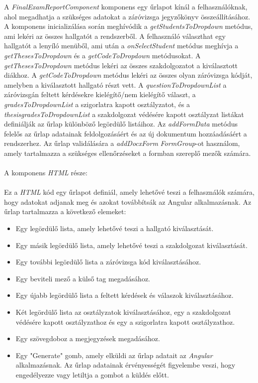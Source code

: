A \textit{FinalExamReportComponent} komponens egy űrlapot kínál a felhasználóknak, ahol megadhatja a szükséges adatokat a záróvizsga jegyzőkönyv összeállításához. A komponens inicializálása során meghívódik a \textit{getStudentsToDropdown} metódus, ami lekéri az összes hallgatót a rendszerből. A felhasználó választhat egy hallgatót a lenyíló menüből, ami után a \textit{onSelectStudent} metódus meghívja a \textit{getThesesToDropdown} és a \textit{getCodeToDropdown} metódusokat. A \textit{getThesesToDropdown} metódus lekéri az összes szakdolgozatot a kiválasztott diákhoz. A \textit{getCodeToDropdown} metódus lekéri az összes olyan záróvizsga kódját, amelyben a kiválasztott hallgató részt vett. A \textit{questionToDropdownList} a záróvizsgán feltett kérdésekre kielégítő/nem kielégítő választ, a \textit{gradesToDropdownList} a szigorlatra kapott osztályzatot, és a \textit{thesisgradesToDropdownList} a szakdolgozat védésére kapott osztályzat listákat definiálják az űrlap különböző legördülő listáihoz. Az \textit{addFormData} metódus felelős az űrlap adatainak feldolgozásáért és az új dokumentum hozzáadásáért a rendszerhez. Az űrlap validálására a \textit{addDocxForm} \textit{FormGroup}-ot használom, amely tartalmazza a szükséges ellenőrzéseket a formban szereplő mezők számára.\\
\\A komponens \textit{HTML} része:\\
\\
Ez a \textit{HTML} kód egy űrlapot definiál, amely lehetővé teszi a felhasználók számára, hogy adatokat adjanak meg és azokat továbbítsák az Angular alkalmazásnak. Az űrlap tartalmazza a következő elemeket:

\begin{itemize}

\item{}Egy legördülő lista, amely lehetővé teszi a hallgató kiválasztását.
\item{}Egy másik legördülő lista, amely lehetővé teszi a szakdolgozat kiválasztását.
\item{}Egy további legördülő lista a záróvizsga kód kiválasztásához.
\item{}Egy beviteli mező a külső tag megadásához.
\item{}Egy újabb legördülő lista a feltett kérdések és válaszok kiválasztásához.
\item{}Két legördülő lista az osztályzatok kiválasztásához, egy a szakdolgozat védésére kapott osztályzathoz és egy a szigorlatra kapott osztályzathoz.
\item{}Egy szövegdoboz a megjegyzések megadásához.
\item{}Egy "Generate" gomb, amely elküldi az űrlap adatait az \textit{Angular} alkalmazásnak. Az űrlap adatainak érvényességét figyelembe veszi, hogy engedélyezze vagy letiltja a gombot a küldés előtt.

\end{itemize}